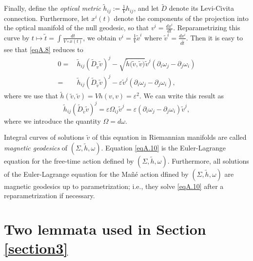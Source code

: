 \documentclass[12pt]{amsart}
\numberwithin{equation}{section}
\begin{document}
Finally, define the \emph{optical metric} ${\tilde h}_{ij}:=\frac{1}{V} h_{ij}$, and let ${\tilde D}$ denote its Levi-Civita connection. Furthermore, let $x^i(t)$ denote the components of the projection into the optical manifold of the null geodesic, so that $v^i=\frac{dx^i}{dt}$. Reparametrizing this curve by $t\mapsto{\tilde t}=\int\frac{dt}{V\circ x(t)}$, we obtain $v^i=\frac{1}{V}{\tilde v}^i$ where ${\tilde v}^i=\frac{dx^i}{d{\tilde t}}$. Then it is easy to see that \eqref{eqA.8} reduces to
\begin{equation}
\label{eqA.9}
\begin{split}
0= &\, {\tilde h}_{ij}\left ( {\tilde D}_{\tilde v} {\tilde v}\right )^j -\sqrt{{\tilde h}({\tilde v},{\tilde v)}} {\tilde v}^j \left ( \partial_i \omega_j- \partial_j\omega_i\right )\\
= &\, {\tilde h}_{ij}\left ( {\tilde D}_{\tilde v} {\tilde v}\right )^j - \varepsilon{\tilde v}^j \left ( \partial_i \omega_j- \partial_j\omega_i\right ),
\end{split}
\end{equation}
where we use that ${\tilde h}({\tilde v},{\tilde v})=Vh(v,v)=\varepsilon^2$. We can write this result as
\begin{equation}
\label{eqA.10}
{\tilde h}_{ij}\left ( {\tilde D}_{\tilde v} {\tilde v}\right )^j = \varepsilon \Omega_{ij}{\tilde v}^j = \varepsilon \left ( \partial_i\omega_j-\partial_j\omega_i\right ){\tilde v}^j,
\end{equation}
where we introduce the quantity $\Omega=d\omega$.

Integral curves of solutions ${\tilde v}$ of this equation in Riemannian manifolds are called \emph{magnetic geodesics} of $(\Sigma,{\tilde h}, \omega)$. Equation \ref{eqA.10} is the Euler-Lagrange equation for the free-time action defined by $(\Sigma,{\tilde h}, \omega)$. Furthermore, all solutions of the Euler-Lagrange equation for the Ma\~n\'e action dfined by $(\Sigma,{\tilde h}, \omega)$ are magnetic geodesics up to parametrization; i.e., they solve \eqref{eqA.10} after a reparametrization if necessary.

\section{Two lemmata used in Section \ref{section3}}\label{appendixB}
\end{document}
